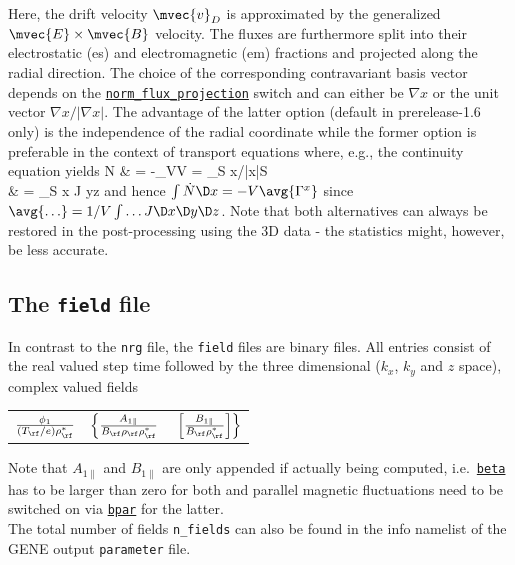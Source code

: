 \documentclass[12pt]{article}
\begin{document}
Here, the drift velocity $\mvec{v}_D$ is approximated by the generalized $\mvec{E}\times\mvec{B}$ velocity.
The fluxes are furthermore split into their electrostatic (es) and electromagnetic (em) fractions and
projected along the radial direction. The choice of the corresponding contravariant basis vector depends on
the \hyperlink{norm_flux_projection}{\tt norm\_flux\_projection} switch and can either be
$\nabla x$ or the unit vector $\nabla x / |\nabla x |$. The advantage of the latter option
(default in prerelease-1.6 only) is the independence of the radial coordinate while the former
option is preferable in the context of transport equations where, e.g., the continuity equation yields
\bea
\dot N & = -\int_V\D V = \int_S \mvec{\Gamma}\cdot\nabla x/|\nabla x|\D S \nn \\
 & = \int_S \mvec{\Gamma}\cdot\nabla x J \D y\D z \nn
\eea
and hence $\int \dot N \D x = -V \avg{\Gamma^x}$ since $\avg{\ldots } = 1/V \int \ldots J \D x \D y \D z$.
Note that both alternatives can always be restored in the post-processing using the 3D data - the
statistics might, however, be less accurate.

\subsection{The \texttt{field} file}
\label{subsec:field-file}
In contrast to the \texttt{nrg} file, the \texttt{field} files are binary files.
All entries consist of the real valued step time followed by the three
dimensional ($k_x$, $k_y$ and $z$ space), complex valued fields
\begin{center}
\begin{tabular}{lll}
$\frac{\phi_1}{(T_\rf/e)\rho_\rf^*}$ &
$\left\{\frac{A_{1\|}}{B_\rf \rho_\rf \rho_\rf^*} \right.$ &
$\left. \left[ \frac{B_{1\|}}{B_\rf \rho_\rf^*} \right]\right\}$
\end{tabular}
\end{center}
Note that $A_{1\|}$ and $B_{1\|}$ are only appended if actually being computed,
i.e.~\hyperlink{beta}{\tt beta} has to be larger than zero for both and
parallel magnetic fluctuations need to be switched on via \hyperlink{bpar}{\tt bpar}
for the latter.\\
The total number of fields {\tt n\_fields} can also be found in the info namelist
 of the {\sc GENE} output {\tt parameter} file.
\end{document}
